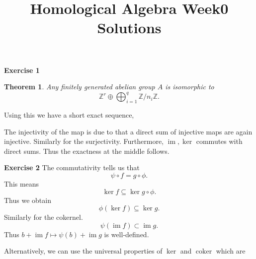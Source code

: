 \documentclass[10pt]{article}
\title{Homological Algebra Week0 Solutions}
\author{}
\date{}
\newtheorem{theorem}{Theorem} [section]
\DeclareMathOperator{\coker}{coker}
\DeclareMathOperator{\image}{im}
\newcommand{\Z}[0]{\mathbb{Z}}
\begin{document}
\maketitle


\par\textbf{Exercise 1}

\begin{theorem}
    Any finitely generated abelian group $A$ is isomorphic to 
    \begin{equation*}
        \Z^r\oplus\bigoplus_{i=1}^q\Z/n_i\Z.
    \end{equation*}
\end{theorem}
Using this we have a short exact sequence,
\begin{center}
\end{center}
The injectivity of the map is due to that a direct sum of injective maps are again injective. Similarly for the surjectivity. Furthermore, $\image,\ker$ commutes with direct sums. Thus the exactness at the middle follows.
\par\textbf{Exercise 2}
The commutativity tells us that 
\begin{equation*}
    \psi\circ f = g\circ \phi.
\end{equation*}
This means 
\begin{equation*}
    \ker f\subseteq\ker g\circ\phi.
\end{equation*}
Thus we obtain 
\begin{equation*}
    \phi(\ker f)\subseteq\ker g.
\end{equation*}
Similarly for the cokernel. 
\begin{equation*}
    \psi(\image f)\subset\image g.
\end{equation*}
Thus $b+\image f\mapsto \psi(b)+\image g$ is well-defined.
\par Alternatively, we can use the universal properties of $\ker$ and $\coker$ which are 
\begin{center}
\end{center}
\end{document}
